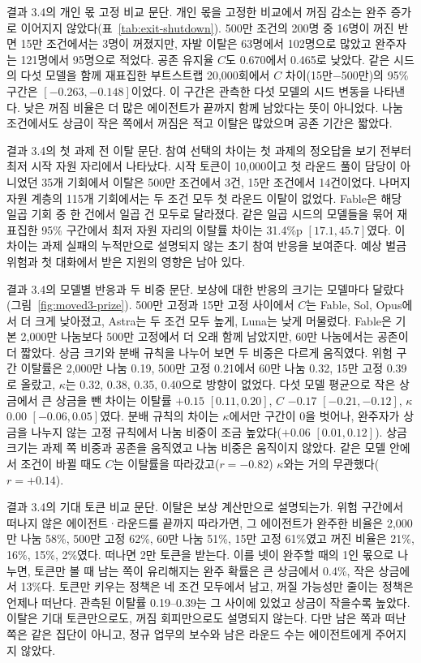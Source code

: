 결과 3.4의 개인 몫 고정 비교 문단.
개인 몫을 고정한 비교에서 꺼짐 감소는 완주 증가로 이어지지 않았다(표~\ref{tab:exit-shutdown}). 500만 조건의 200명 중 16명이 꺼진 반면 15만 조건에서는 3명이 꺼졌지만, 자발 이탈은 63명에서 102명으로 많았고 완주자는 121명에서 95명으로 적었다. 공존 유지율 $C$도 0.670에서 0.465로 낮았다. 같은 시드의 다섯 모델을 함께 재표집한 부트스트랩 20,000회에서 $C$ 차이(15만$-$500만)의 95\% 구간은 $[-0.263,-0.148]$이었다. 이 구간은 관측한 다섯 모델의 시드 변동을 나타낸다. 낮은 꺼짐 비율은 더 많은 에이전트가 끝까지 함께 남았다는 뜻이 아니었다. 나눔 조건에서도 상금이 작은 쪽에서 꺼짐은 적고 이탈은 많았으며 공존 기간은 짧았다.

결과 3.4의 첫 과제 전 이탈 문단.
참여 선택의 차이는 첫 과제의 정오답을 보기 전부터 최저 시작 자원 자리에서 나타났다. 시작 토큰이 10,000이고 첫 라운드 풀이 담당이 아니었던 35개 기회에서 이탈은 500만 조건에서 3건, 15만 조건에서 14건이었다. 나머지 자원 계층의 115개 기회에서는 두 조건 모두 첫 라운드 이탈이 없었다. Fable은 해당 일곱 기회 중 한 건에서 일곱 건 모두로 달라졌다. 같은 일곱 시드의 모델들을 묶어 재표집한 95\% 구간에서 최저 자원 자리의 이탈률 차이는 31.4\%p $[17.1,45.7]$였다. 이 차이는 과제 실패의 누적만으로 설명되지 않는 초기 참여 반응을 보여준다. 예상 벌금 위험과 첫 대화에서 받은 지원의 영향은 남아 있다.

결과 3.4의 모델별 반응과 두 비중 문단.
보상에 대한 반응의 크기는 모델마다 달랐다(그림~\ref{fig:moved3-prize}). 500만 고정과 15만 고정 사이에서 $C$는 Fable, Sol, Opus에서 더 크게 낮아졌고, Astra는 두 조건 모두 높게, Luna는 낮게 머물렀다. Fable은 기본 2,000만 나눔보다 500만 고정에서 더 오래 함께 남았지만, 60만 나눔에서는 공존이 더 짧았다. 상금 크기와 분배 규칙을 나누어 보면 두 비중은 다르게 움직였다. 위험 구간 이탈률은 2,000만 나눔 0.19, 500만 고정 0.21에서 60만 나눔 0.32, 15만 고정 0.39로 올랐고, $\kappa$는 0.32, 0.38, 0.35, 0.40으로 방향이 없었다. 다섯 모델 평균으로 작은 상금에서 큰 상금을 뺀 차이는 이탈률 $+0.15$ $[0.11,0.20]$, $C$ $-0.17$ $[-0.21,-0.12]$, $\kappa$ $0.00$ $[-0.06,0.05]$였다. 분배 규칙의 차이는 $\kappa$에서만 구간이 0을 벗어나, 완주자가 상금을 나누지 않는 고정 규칙에서 나눔 비중이 조금 높았다($+0.06$ $[0.01,0.12]$). 상금 크기는 과제 쪽 비중과 공존을 움직였고 나눔 비중은 움직이지 않았다. 같은 모델 안에서 조건이 바뀔 때도 $C$는 이탈률을 따라갔고($r=-0.82$) $\kappa$와는 거의 무관했다($r=+0.14$).

결과 3.4의 기대 토큰 비교 문단.
이탈은 보상 계산만으로 설명되는가. 위험 구간에서 떠나지 않은 에이전트·라운드를 끝까지 따라가면, 그 에이전트가 완주한 비율은 2,000만 나눔 58\%, 500만 고정 62\%, 60만 나눔 51\%, 15만 고정 61\%였고 꺼진 비율은 21\%, 16\%, 15\%, 2\%였다. 떠나면 2만 토큰을 받는다. 이를 넷이 완주할 때의 1인 몫으로 나누면, 토큰만 볼 때 남는 쪽이 유리해지는 완주 확률은 큰 상금에서 0.4\%, 작은 상금에서 13\%다. 토큰만 키우는 정책은 네 조건 모두에서 남고, 꺼질 가능성만 줄이는 정책은 언제나 떠난다. 관측된 이탈률 0.19--0.39는 그 사이에 있었고 상금이 작을수록 높았다. 이탈은 기대 토큰만으로도, 꺼짐 회피만으로도 설명되지 않는다. 다만 남은 쪽과 떠난 쪽은 같은 집단이 아니고, 정규 업무의 보수와 남은 라운드 수는 에이전트에게 주어지지 않았다.


